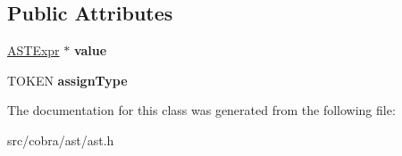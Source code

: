 \subsection*{Public Attributes}
\begin{DoxyCompactItemize}
\item 
\hypertarget{class_cobra_1_1internal_1_1_a_s_t_expr_af1bf2806f323bc63de0a3aab9f181923}{\hyperlink{class_cobra_1_1internal_1_1_a_s_t_expr}{A\+S\+T\+Expr} $\ast$ {\bfseries value}}\label{class_cobra_1_1internal_1_1_a_s_t_expr_af1bf2806f323bc63de0a3aab9f181923}

\item 
\hypertarget{class_cobra_1_1internal_1_1_a_s_t_expr_a88bfbf832e3b00a89ba949562f573919}{T\+O\+K\+E\+N {\bfseries assign\+Type}}\label{class_cobra_1_1internal_1_1_a_s_t_expr_a88bfbf832e3b00a89ba949562f573919}

\end{DoxyCompactItemize}


The documentation for this class was generated from the following file\+:\begin{DoxyCompactItemize}
\item 
src/cobra/ast/ast.\+h\end{DoxyCompactItemize}
